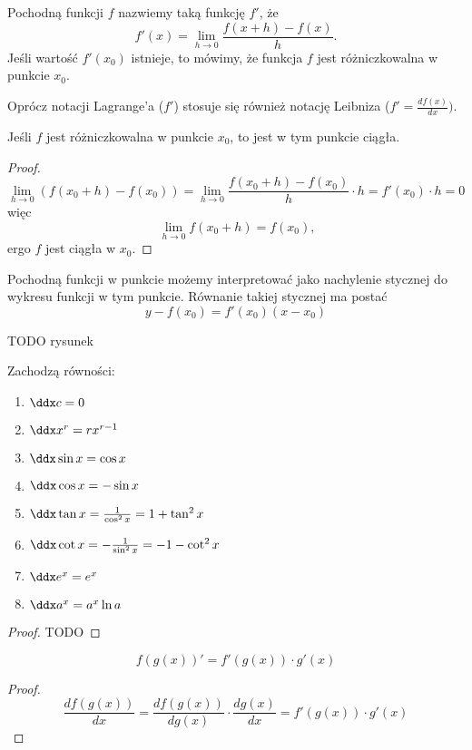 \begin{definition}
    Pochodną funkcji $f$ nazwiemy taką funkcję $f'$, że
    \[ f'(x) = \lim_{h\to 0}\frac{f(x + h) - f(x)}{h}. \]
    Jeśli wartość $f'(x_0)$ istnieje, to mówimy, że funkcja $f$ jest różniczkowalna w punkcie $x_0$.
\end{definition}

Oprócz notacji Lagrange'a ($f'$) stosuje się również notację Leibniza ($f' = \frac{df(x)}{dx})$.

\begin{theorem}
    Jeśli $f$ jest różniczkowalna w punkcie $x_0$, to jest w tym punkcie ciągła.
\end{theorem}
\begin{proof}
    \[ \lim_{h \to 0}(f(x_0 + h) - f(x_0)) = \lim_{h \to 0}\frac{f(x_0 + h) - f(x_0)}{h} \cdot h = f'(x_0) \cdot h = 0 \]
    więc
    \[\ \lim_{h\to 0}f(x_0 + h) = f(x_0), \]
    ergo $f$ jest ciągła w $x_0$.
\end{proof}

Pochodną funkcji w punkcie możemy interpretować jako nachylenie stycznej do wykresu funkcji w tym punkcie. Równanie takiej stycznej ma postać
\begin{equation}
    y - f(x_0) = f'(x_0)(x - x_0)
\end{equation}

TODO rysunek

\begin{theorem}
    Zachodzą równości:
    \begin{enumerate}
        \item $\ddx c = 0$
        \item $\ddx x^r = rx^{r-1}$
        \item $\ddx \sin x = \cos x$
        \item $\ddx \cos x = -\sin x$
        \item $\ddx \tan x = \frac{1}{\cos^2 x} = 1 + \tan^2 x$
        \item $\ddx \cot x = - \frac{1}{\sin^2 x} = -1 - \cot^2 x$
        \item $\ddx e^x = e^x$
        \item $\ddx a^x = a^x \ln a$
    \end{enumerate}
\end{theorem}
\begin{proof}
    TODO
\end{proof}

\begin{theorem}
    \[ f(g(x))' = f'(g(x)) \cdot g'(x) \]
\end{theorem}
\begin{proof}
    \[ \frac{df(g(x))}{dx} = \frac{df(g(x))}{dg(x)}\cdot\frac{dg(x)}{dx} = f'(g(x)) \cdot g'(x) \]
\end{proof}

